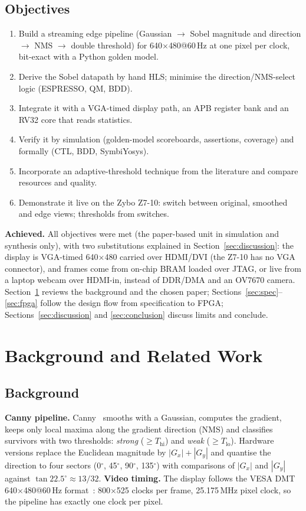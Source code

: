\documentclass[11pt,a4paper]{article}
\begin{document}
\subsection{Objectives}
\begin{enumerate}
  \item Build a streaming edge pipeline (Gaussian $\rightarrow$ Sobel magnitude and direction $\rightarrow$ NMS
  $\rightarrow$ double threshold) for 640$\times$480@60\,Hz at one pixel per clock, bit-exact with a Python golden model.
  \item Derive the Sobel datapath by hand HLS; minimise the direction/NMS-select logic (ESPRESSO, QM, BDD).
  \item Integrate it with a VGA-timed display path, an APB register bank and an RV32 core that reads statistics.
  \item Verify it by simulation (golden-model scoreboards, assertions, coverage) and formally (CTL, BDD, SymbiYosys).
  \item Incorporate an adaptive-threshold technique from the literature and compare resources and quality.
  \item Demonstrate it live on the Zybo Z7-10: switch between original, smoothed and edge views; thresholds from switches.
\end{enumerate}
\textbf{Achieved.} All objectives were met (the paper-based unit in simulation and synthesis only), with two substitutions explained in Section~\ref{sec:discussion}: the
display is VGA-timed 640$\times$480 carried over HDMI/DVI (the Z7-10 has no VGA connector), and frames come from on-chip BRAM
loaded over JTAG, or live from a laptop webcam over HDMI-in, instead of DDR/DMA and an OV7670 camera.
Section~\ref{sec:related} reviews the background and the chosen paper; Sections~\ref{sec:spec}--\ref{sec:fpga} follow the design
flow from specification to FPGA; Sections~\ref{sec:discussion} and \ref{sec:conclusion} discuss limits and conclude.

\section{Background and Related Work}
\label{sec:related}
\subsection{Background}
\textbf{Canny pipeline.} Canny~\cite{canny} smooths with a Gaussian, computes the gradient, keeps only local maxima along the
gradient direction (NMS) and classifies survivors with two thresholds: \emph{strong} ($\ge T_\text{hi}$) and \emph{weak}
($\ge T_\text{lo}$). Hardware versions replace the Euclidean magnitude by $|G_x|+|G_y|$ and quantise the direction to four
sectors (0$^\circ$, 45$^\circ$, 90$^\circ$, 135$^\circ$) with comparisons of $|G_x|$ and $|G_y|$ against $\tan 22.5^\circ\approx 13/32$.
\textbf{Video timing.} The display follows the VESA DMT 640$\times$480@60\,Hz format~\cite{vesa}: 800$\times$525 clocks per frame,
25.175\,MHz pixel clock, so the pipeline has exactly one clock per pixel.
\end{document}
